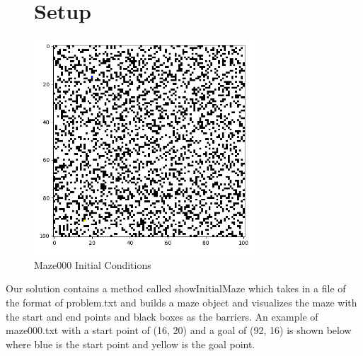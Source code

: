\documentclass[a4paper]{article}
\begin{document}
\begin{figure}
    \section*{{Setup}}
    \centering
    \includegraphics[width=0.75\textwidth]{fig1.png}
    \caption{Maze000 Initial Conditions}
    \label{fig:Maze000}
\end{figure}

Our solution contains a method called showInitialMaze which takes in a file of the format of problem.txt and builds a maze object and visualizes the maze with the start and end points and black boxes as the barriers. An example of maze000.txt with a start point of (16, 20) and a goal of (92, 16) is shown below where blue is the start point and yellow is the goal point. 
\newpage
\end{document}
